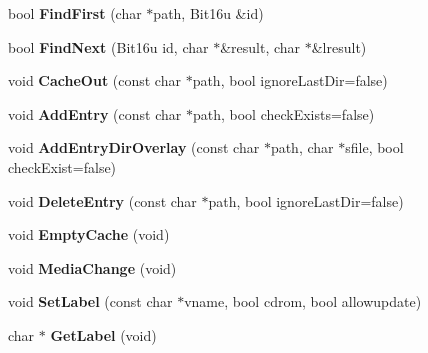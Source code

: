 \begin{DoxyCompactItemize}
\item 
\hypertarget{classDOS__Drive__Cache_ae19e2c7e6730d76b492bbc62d0edb38f}{bool {\bfseries Find\-First} (char $\ast$path, Bit16u \&id)}\label{classDOS__Drive__Cache_ae19e2c7e6730d76b492bbc62d0edb38f}

\item 
\hypertarget{classDOS__Drive__Cache_a8195f6dab2ac6793fec5b4d015394f82}{bool {\bfseries Find\-Next} (Bit16u id, char $\ast$\&result, char $\ast$\&lresult)}\label{classDOS__Drive__Cache_a8195f6dab2ac6793fec5b4d015394f82}

\item 
\hypertarget{classDOS__Drive__Cache_ac1cf68069ab790fb1b3a35686b3625c6}{void {\bfseries Cache\-Out} (const char $\ast$path, bool ignore\-Last\-Dir=false)}\label{classDOS__Drive__Cache_ac1cf68069ab790fb1b3a35686b3625c6}

\item 
\hypertarget{classDOS__Drive__Cache_a28ee1c3b7a9d952b7b688d4179f25250}{void {\bfseries Add\-Entry} (const char $\ast$path, bool check\-Exists=false)}\label{classDOS__Drive__Cache_a28ee1c3b7a9d952b7b688d4179f25250}

\item 
\hypertarget{classDOS__Drive__Cache_a45a5c92f6a32812185aaec5116dc9b30}{void {\bfseries Add\-Entry\-Dir\-Overlay} (const char $\ast$path, char $\ast$sfile, bool check\-Exist=false)}\label{classDOS__Drive__Cache_a45a5c92f6a32812185aaec5116dc9b30}

\item 
\hypertarget{classDOS__Drive__Cache_a68d34280ef1d383e84f98f2df46de333}{void {\bfseries Delete\-Entry} (const char $\ast$path, bool ignore\-Last\-Dir=false)}\label{classDOS__Drive__Cache_a68d34280ef1d383e84f98f2df46de333}

\item 
\hypertarget{classDOS__Drive__Cache_a37fc4a803fa8ac753d3e084ee52e0daf}{void {\bfseries Empty\-Cache} (void)}\label{classDOS__Drive__Cache_a37fc4a803fa8ac753d3e084ee52e0daf}

\item 
\hypertarget{classDOS__Drive__Cache_a6015de7335a108069e32a1fdebfcd890}{void {\bfseries Media\-Change} (void)}\label{classDOS__Drive__Cache_a6015de7335a108069e32a1fdebfcd890}

\item 
\hypertarget{classDOS__Drive__Cache_a505cfc29276623d017fe59cc5c815ec2}{void {\bfseries Set\-Label} (const char $\ast$vname, bool cdrom, bool allowupdate)}\label{classDOS__Drive__Cache_a505cfc29276623d017fe59cc5c815ec2}

\item 
\hypertarget{classDOS__Drive__Cache_a5226fd65de22dc1ed73103dce3b6d668}{char $\ast$ {\bfseries Get\-Label} (void)}\label{classDOS__Drive__Cache_a5226fd65de22dc1ed73103dce3b6d668}

\end{DoxyCompactItemize}


